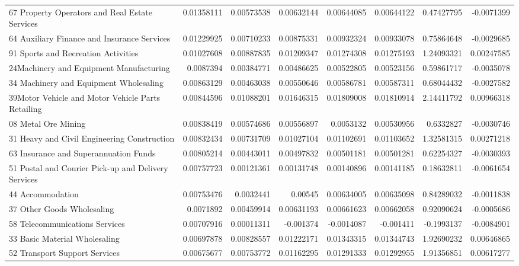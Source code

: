 \documentclass{monashthesis}
\begin{document}
\begin{table}[ht]
{\begin{tabular}{|l|r|rrrr|rr|}
    67 Property Operators and Real Estate Services & 0.01358111 & 0.00573538 & 0.00632144 & 0.00644085 & 0.00644122 & 0.47427795 & -0.0071399 \\
    64 Auxiliary Finance and Insurance Services & 0.01229925 & 0.00710233 & 0.00875331 & 0.00932324 & 0.00933078 & 0.75864648 & -0.0029685 \\
    91 Sports and Recreation Activities & 0.01027608 & 0.00887835 & 0.01209347 & 0.01274308 & 0.01275193 & 1.24093321 & 0.00247585 \\
    24Machinery and Equipment Manufacturing & 0.0087394 & 0.00384771 & 0.00486625 & 0.00522805 & 0.00523156 & 0.59861717 & -0.0035078 \\
    34 Machinery and Equipment Wholesaling & 0.00863129 & 0.00463038 & 0.00550646 & 0.00586781 & 0.00587311 & 0.68044432 & -0.0027582 \\
    39Motor Vehicle and Motor Vehicle Parts Retailing & 0.00844596 & 0.01088201 & 0.01646315 & 0.01809008 & 0.01810914 & 2.14411792 & 0.00966318 \\
    08 Metal Ore Mining & 0.00838419 & 0.00574686 & 0.00556897 & 0.0053132 & 0.00530956 & 0.6332827 & -0.0030746 \\
    31 Heavy and Civil Engineering Construction & 0.00832434 & 0.00731709 & 0.01027104 & 0.01102691 & 0.01103652 & 1.32581315 & 0.00271218 \\
    63 Insurance and Superannuation Funds & 0.00805214 & 0.00443011 & 0.00497832 & 0.00501181 & 0.00501281 & 0.62254327 & -0.0030393 \\
    51 Postal and Courier Pick-up and Delivery Services & 0.00757723 & 0.00121361 & 0.00131748 & 0.00140896 & 0.00141185 & 0.18632811 & -0.0061654 \\
    44 Accommodation & 0.00753476 & 0.0032441 & 0.00545 & 0.00634005 & 0.00635098 & 0.84289032 & -0.0011838 \\
    37 Other Goods Wholesaling & 0.0071892 & 0.00459914 & 0.00631193 & 0.00661623 & 0.00662058 & 0.92090624 & -0.0005686 \\
    58 Telecommunications Services & 0.00707916 & 0.00011311 & -0.001374 & -0.0014087 & -0.001411 & -0.1993137 & -0.0084901 \\
  33 Basic Material Wholesaling & 0.00697878 & 0.00828557 & 0.01222171 & 0.01343315 & 0.01344743 & 1.92690232 & 0.00646865 \\
    52 Transport Support Services & 0.00675677 & 0.00753772 & 0.01162295 & 0.01291333 & 0.01292955 & 1.91356851 & 0.00617277 \\

\end{tabular}}
\end{table}
\end{document}
